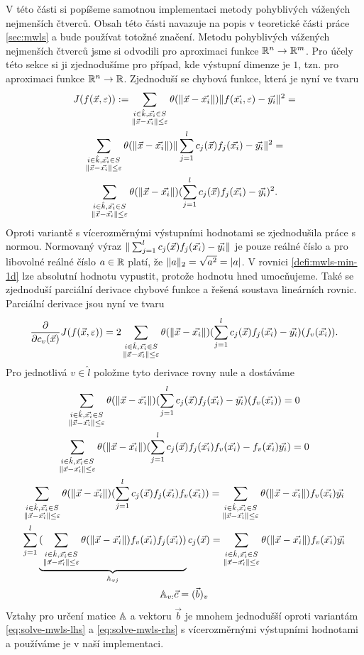 V této části si popíšeme samotnou implementaci metody pohyblivých vážených nejmenších čtverců. Obsah této části navazuje na popis v teoretické části práce \ref{sec:mwls} a bude používat totožné značení. Metodu pohyblivých vážených nejmenších čtverců jsme si odvodili pro aproximaci funkce $\mathbb{R}^n \rightarrow \mathbb{R}^m$. Pro účely této sekce si ji zjednodušíme pro případ, kde výstupní dimenze je $1$, tzn. pro aproximaci funkce $\mathbb{R}^n \rightarrow \mathbb{R}$. Zjednoduší se chybová funkce, která je nyní ve tvaru
\begin{multline}
  \label{defi:mwls-min-1d}
  J(f(\vec{x},\varepsilon)) :=
  \sum_{\substack{i \in \hat k, \vec{x_i} \in S\\\|\vec{x}-\vec{x_i}\| \leq \varepsilon}} \theta(\|\vec{x}-\vec{x_i}\|)\|f(\vec{x_i},\varepsilon)-\vec{y_i}\|^2=\\
  \sum_{\substack{i \in \hat k, \vec{x_i} \in S\\\|\vec{x}-\vec{x_i}\| \leq \varepsilon}} \theta(\|\vec{x}-\vec{x_i}\|)\|\sum_{j=1}^l c_j(\vec{x})f_j(\vec{x_i})-\vec{y_i}\|^2=\\
  \sum_{\substack{i \in \hat k, \vec{x_i} \in S\\\|\vec{x}-\vec{x_i}\| \leq \varepsilon}} \theta(\|\vec{x}-\vec{x_i}\|)(\sum_{j=1}^l c_j(\vec{x})f_j(\vec{x_i})-\vec{y_i})^2.\\
\end{multline}
Oproti variantě s vícerozměrnými výstupními hodnotami se zjednodušila práce s normou. Normovaný výraz $\|\sum_{j=1}^l c_j(\vec{x})f_j(\vec{x_i})-\vec{y_i}\|$ je pouze reálné číslo a pro libovolné reálné číslo $a \in \mathbb{R}$ platí, že $\|a\|_2 = \sqrt{a^2} = |a|$. V rovnici \ref{defi:mwls-min-1d} lze absolutní hodnotu vypustit, protože hodnotu hned umocňujeme. Také se zjednoduší parciální derivace chybové funkce a řešená soustava lineárních rovnic. Parciální derivace jsou nyní ve tvaru
\begin{equation}
  \label{eq:mwls-diff-1d}
  \frac{\partial}{\partial c_v(\vec{x})} J(f(\vec{x},\varepsilon)) =
  2\sum_{\substack{i \in \hat k, \vec{x_i} \in S\\\|\vec{x}-\vec{x_i}\| \leq \varepsilon}} \theta(\|\vec{x}-\vec{x_i}\|)(\sum_{j=1}^l c_j(\vec{x})f_j(\vec{x_i})-\vec{y_i})(f_v(\vec{x_i})).
\end{equation}
Pro jednotlivá $v \in \hat l$ položme tyto derivace rovny nule a dostáváme
\begin{multline}
  \label{eq:mwls-solve-1d}
  \sum_{\substack{i \in \hat k, \vec{x_i} \in S\\\|\vec{x}-\vec{x_i}\| \leq \varepsilon}} \theta(\|\vec{x}-\vec{x_i}\|)(\sum_{j=1}^l c_j(\vec{x})f_j(\vec{x_i})-\vec{y_i})(f_v(\vec{x_i})) = 0\\
  \sum_{\substack{i \in \hat k, \vec{x_i} \in S\\\|\vec{x}-\vec{x_i}\| \leq \varepsilon}} \theta(\|\vec{x}-\vec{x_i}\|)(\sum_{j=1}^l c_j(\vec{x})f_j(\vec{x_i})f_v(\vec{x_i})-f_v(\vec{x_i})\vec{y_i}) = 0\\
  \sum_{\substack{i \in \hat k, \vec{x_i} \in S\\\|\vec{x}-\vec{x_i}\| \leq \varepsilon}} \theta(\|\vec{x}-\vec{x_i}\|)(\sum_{j=1}^l c_j(\vec{x})f_j(\vec{x_i})f_v(\vec{x_i})) = \sum_{\substack{i \in \hat k, \vec{x_i} \in S\\\|\vec{x}-\vec{x_i}\| \leq \varepsilon}} \theta(\|\vec{x}-\vec{x_i}\|)f_v(\vec{x_i})\vec{y_i}\\
  \sum_{j=1}^l \underbrace{(\sum_{\substack{i \in \hat k, \vec{x_i} \in S\\\|\vec{x}-\vec{x_i}\| \leq \varepsilon}} \theta(\|\vec{x}-\vec{x_i}\|) f_v(\vec{x_i})f_j(\vec{x_i}))}_{\mathbb{A}_{vj}}c_j(\vec{x}) = \sum_{\substack{i \in \hat k, \vec{x_i} \in S\\\|\vec{x}-\vec{x_i}\| \leq \varepsilon}} \theta(\|\vec{x}-\vec{x_i}\|)f_v(\vec{x_i})\vec{y_i}\\
  \mathbb{A}_{v:}\vec{c} = (\vec{b})_v\\
\end{multline}
Vztahy pro určení matice $\mathbb{A}$ a vektoru $\vec{b}$ je mnohem jednodušší oproti variantám \ref{eq:solve-mwls-lhs} a \ref{eq:solve-mwls-rhs} s vícerozměrnými výstupními hodnotami a používáme je v naší implementaci.

